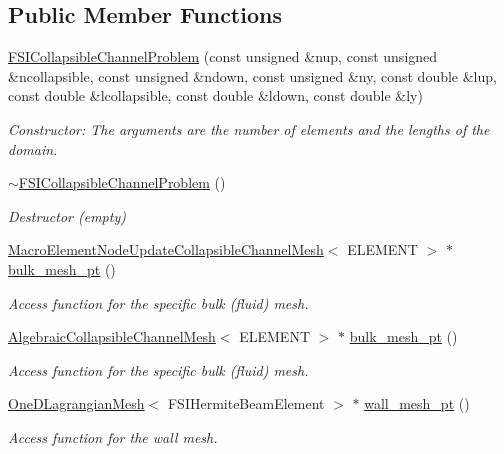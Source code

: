 \subsection*{Public Member Functions}
\begin{DoxyCompactItemize}
\item 
\hyperlink{classFSICollapsibleChannelProblem_afe14ae0d2bdfc9a15969c9bdcd6e2512}{F\+S\+I\+Collapsible\+Channel\+Problem} (const unsigned \&nup, const unsigned \&ncollapsible, const unsigned \&ndown, const unsigned \&ny, const double \&lup, const double \&lcollapsible, const double \&ldown, const double \&ly)
\begin{DoxyCompactList}\small\item\em Constructor\+: The arguments are the number of elements and the lengths of the domain. \end{DoxyCompactList}\item 
\hyperlink{classFSICollapsibleChannelProblem_abe33aaaae15ea3eb10885527a1d1ad9a}{$\sim$\+F\+S\+I\+Collapsible\+Channel\+Problem} ()
\begin{DoxyCompactList}\small\item\em Destructor (empty) \end{DoxyCompactList}\item 
\hyperlink{classoomph_1_1MacroElementNodeUpdateCollapsibleChannelMesh}{Macro\+Element\+Node\+Update\+Collapsible\+Channel\+Mesh}$<$ E\+L\+E\+M\+E\+NT $>$ $\ast$ \hyperlink{classFSICollapsibleChannelProblem_a5ea2780b4f97b65b5c122a952093e6c2}{bulk\+\_\+mesh\+\_\+pt} ()
\begin{DoxyCompactList}\small\item\em Access function for the specific bulk (fluid) mesh. \end{DoxyCompactList}\item 
\hyperlink{classoomph_1_1AlgebraicCollapsibleChannelMesh}{Algebraic\+Collapsible\+Channel\+Mesh}$<$ E\+L\+E\+M\+E\+NT $>$ $\ast$ \hyperlink{classFSICollapsibleChannelProblem_a9b461f3afef3185ea0b461714675ef8f}{bulk\+\_\+mesh\+\_\+pt} ()
\begin{DoxyCompactList}\small\item\em Access function for the specific bulk (fluid) mesh. \end{DoxyCompactList}\item 
\hyperlink{classoomph_1_1OneDLagrangianMesh}{One\+D\+Lagrangian\+Mesh}$<$ F\+S\+I\+Hermite\+Beam\+Element $>$ $\ast$ \hyperlink{classFSICollapsibleChannelProblem_ae8b71da8da82f3c52387052ce400b930}{wall\+\_\+mesh\+\_\+pt} ()
\begin{DoxyCompactList}\small\item\em Access function for the wall mesh. \end{DoxyCompactList}\item 

\end{DoxyCompactItemize}
